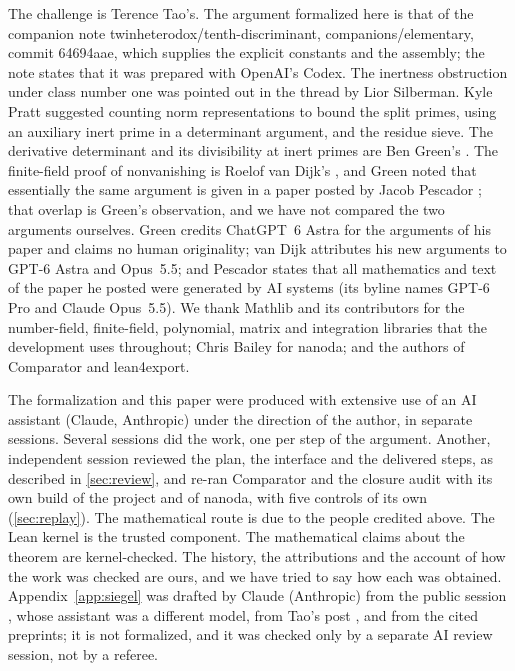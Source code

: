 \documentclass[11pt]{article}
\theoremstyle{definition}
\begin{document}
The challenge is Terence Tao's. The argument formalized here is that of the companion note twinheterodox/tenth-discriminant, companions/elementary, commit 64694aae, which supplies the explicit constants and the assembly; the note states that it was prepared with OpenAI's Codex. The inertness obstruction under class number one was pointed out in the thread by Lior Silberman. Kyle Pratt suggested counting norm representations to bound the split primes, using an auxiliary inert prime in a determinant argument, and the residue sieve. The derivative determinant and its divisibility at inert primes are Ben Green's \cite{Green2026}. The finite-field proof of nonvanishing is Roelof van Dijk's \cite{vanDijk2026v1}, and Green noted that essentially the same argument is given in a paper posted by Jacob Pescador \cite{Pescador2026}; that overlap is Green's observation, and we have not compared the two arguments ourselves. Green credits ChatGPT~6 Astra for the arguments of his paper and claims no human originality; van Dijk attributes his new arguments to GPT-6 Astra and Opus~5.5; and Pescador states that all mathematics and text of the paper he posted were generated by AI systems (its byline names GPT-6 Pro and Claude Opus~5.5). We thank Mathlib and its contributors for the number-field, finite-field, polynomial, matrix and integration libraries that the development uses throughout; Chris Bailey for nanoda; and the authors of Comparator and lean4export.

The formalization and this paper were produced with extensive use of an AI assistant (Claude, Anthropic) under the direction of the author, in separate sessions. Several sessions did the work, one per step of the argument. Another, independent session reviewed the plan, the interface and the delivered steps, as described in \cref{sec:review}, and re-ran Comparator and the closure audit with its own build of the project and of nanoda, with five controls of its own (\cref{sec:replay}). The mathematical route is due to the people credited above. The Lean kernel is the trusted component. The mathematical claims about the theorem are kernel-checked. The history, the attributions and the account of how the work was checked are ours, and we have tried to say how each was obtained. Appendix~\ref{app:siegel} was drafted by Claude (Anthropic) from the public session \cite{OMOSsession2026}, whose assistant was a different model, from Tao's post \cite{TaoSketch2026}, and from the cited preprints; it is not formalized, and it was checked only by a separate AI review session, not by a referee.



\end{document}
